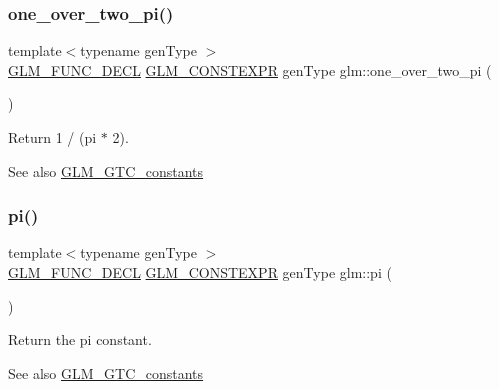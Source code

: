 \subsubsection{\texorpdfstring{one\+\_\+over\+\_\+two\+\_\+pi()}{one\_over\_two\_pi()}}
{\footnotesize\ttfamily template$<$typename gen\+Type $>$ \\
\mbox{\hyperlink{setup_8hpp_ab2d052de21a70539923e9bcbf6e83a51}{G\+L\+M\+\_\+\+F\+U\+N\+C\+\_\+\+D\+E\+CL}} \mbox{\hyperlink{setup_8hpp_a08b807947b47031d3a511f03f89645ad}{G\+L\+M\+\_\+\+C\+O\+N\+S\+T\+E\+X\+PR}} gen\+Type glm\+::one\+\_\+over\+\_\+two\+\_\+pi (\begin{DoxyParamCaption}{ }\end{DoxyParamCaption})}

Return 1 / (pi $\ast$ 2). \begin{DoxySeeAlso}{See also}
\mbox{\hyperlink{group__gtc__constants}{G\+L\+M\+\_\+\+G\+T\+C\+\_\+constants}} 
\end{DoxySeeAlso}
\mbox{\label{group__gtc__constants_ga94bafeb2a0f23ab6450fed1f98ee4e45}} 
\subsubsection{\texorpdfstring{pi()}{pi()}}
{\footnotesize\ttfamily template$<$typename gen\+Type $>$ \\
\mbox{\hyperlink{setup_8hpp_ab2d052de21a70539923e9bcbf6e83a51}{G\+L\+M\+\_\+\+F\+U\+N\+C\+\_\+\+D\+E\+CL}} \mbox{\hyperlink{setup_8hpp_a08b807947b47031d3a511f03f89645ad}{G\+L\+M\+\_\+\+C\+O\+N\+S\+T\+E\+X\+PR}} gen\+Type glm\+::pi (\begin{DoxyParamCaption}{ }\end{DoxyParamCaption})}

Return the pi constant. \begin{DoxySeeAlso}{See also}
\mbox{\hyperlink{group__gtc__constants}{G\+L\+M\+\_\+\+G\+T\+C\+\_\+constants}} 
\end{DoxySeeAlso}
\mbox{\label{group__gtc__constants_ga3c9df42bd73c519a995c43f0f99e77e0}} 

